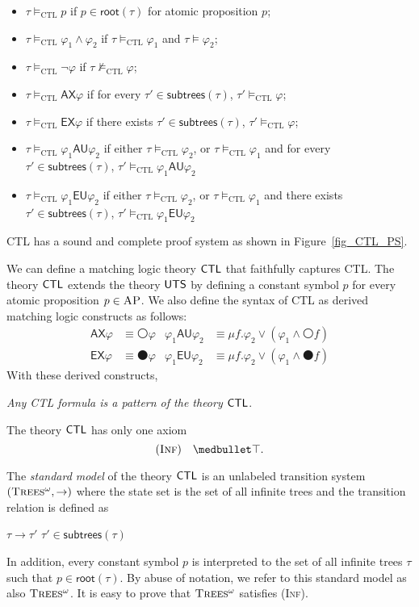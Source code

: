 \documentclass[acmsmall]{acmart}
\newcommand{\AP}{\textsc{AP}}
\newcommand{\wnext}{{\medcirc}}
\newcommand{\snext}{{\medbullet}}
\newcommand{\AX}{\mathsf{AX}}
\newcommand{\AU}{\mathbin{\mathsf{AU}}}
\newcommand{\EU}{\mathbin{\mathsf{EU}}}
\newcommand{\EX}{\mathsf{EX}}
\newcommand{\rt}{\mathsf{root}}
\newcommand{\subtrees}{\mathsf{subtrees}}
\newcommand{\infTrees}{\textsc{Trees$^\omega$}\xspace}
\newcommand{\MLUTS}{\textnormal{\textsf{UTS}}\xspace}
\newcommand{\MLCTL}{\textnormal{\textsf{CTL}}\xspace}
\newcommand{\textiff}{\quad \text{if and only if} \quad}
\newcommand{\prule}[1]{\textnormal{(\textsc{#1})}}
\newcommand{\Inf}{\prule{Inf}\xspace}
\newcommand{\CTL}{\mathrm{CTL}}
\begin{document}
\begin{itemize}
\item $\tau
       \vDash_\CTL p$ if $p \in \rt(\tau)$ for atomic proposition $p$;
\item $\tau  \vDash_\CTL \varphi_1 \wedge \varphi_2$
      if $\tau  \vDash_\CTL \varphi_1$ and 
      $\tau  \vDash \varphi_2$;
\item $\tau  \vDash_\CTL \neg \varphi$
      if $\tau  \not\vDash_\CTL \varphi$;
\item $\tau \vDash_\CTL \AX \varphi$
      if for every $\tau' \in \subtrees(\tau)$,
      $\tau' \vDash_\CTL \varphi$;
\item $\tau \vDash_\CTL \EX \varphi$
      if there exists $\tau' \in \subtrees(\tau)$,
      $\tau' \vDash_\CTL \varphi$;
\item $\tau \vDash_\CTL \varphi_1 \AU \varphi_2$
      if either $\tau \vDash_\CTL \varphi_2$,
      or $\tau \vDash_\CTL \varphi_1$ and
      for every $\tau' \in \subtrees(\tau)$,
      $\tau' \vDash_\CTL \varphi_1 \AU \varphi_2$
\item $\tau \vDash_\CTL \varphi_1 \EU \varphi_2$
      if either $\tau \vDash_\CTL \varphi_2$,
      or $\tau \vDash_\CTL \varphi_1$ and
      there exists $\tau' \in \subtrees(\tau)$,
      $\tau' \vDash_\CTL \varphi_1 \EU \varphi_2$      
\end{itemize}
CTL has a sound and complete proof system as shown in
Figure~\ref{fig_CTL_PS}.

We can define a matching logic theory $\MLCTL$
that faithfully captures CTL.
The theory $\MLCTL$ extends the theory $\MLUTS$
by defining a constant symbol $p$ for every atomic proposition
$p \in \AP$.
We also define the syntax of CTL 
as derived matching logic constructs as follows:
\begin{align*}
\AX \varphi &\equiv \wnext \varphi
&
\varphi_1 \AU \varphi_2 &\equiv 
\mu f . \varphi_2 \vee (\varphi_1 \wedge \wnext f) \\
\EX \varphi &\equiv \snext \varphi
&
\varphi_1 \EU \varphi_2 &\equiv 
\mu f . \varphi_2 \vee (\varphi_1 \wedge \snext f)
\end{align*}
With these derived constructs,
\begin{center}
\emph{Any CTL formula is a pattern of the theory $\MLCTL$}.
\end{center}
The theory $\MLCTL$ has only one axiom
$$\Inf \quad \snext \top.$$

The \emph{standard model} of the theory $\MLCTL$ is 
an unlabeled transition system
$(\infTrees, \to)$
where the state set is the set of all infinite trees
and the transition relation is defined as
\begin{center}
$\tau \to \tau'$ \textiff
$\tau' \in \subtrees(\tau)$
\end{center}
In addition, every constant symbol $p$ is interpreted to
the set of all infinite trees $\tau$ such that
$p \in \rt(\tau)$.
By abuse of notation, we refer to this standard model
as also $\infTrees$.
It is easy to prove that $\infTrees$ satisfies \Inf.
\end{document}
